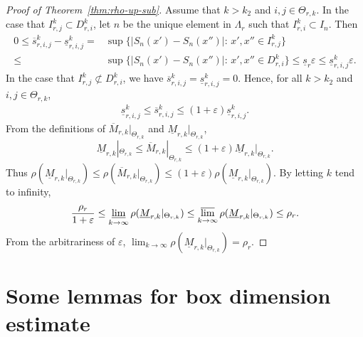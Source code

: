 \documentclass[11pt]{amsart}
\theoremstyle{definition}
\theoremstyle{remark}
\numberwithin{equation}{section}
\newcommand{\upM}{{\overline{M}}}
\newcommand{\lowM}{{\underline{M}}}
\newcommand{\ups}{{\overline{s} }}
\newcommand{\lows}{{\underline{s}}}
\newcommand{\uprho}{{{\rho}}}
\def\vep{\varepsilon}
\begin{document}
\begin{proof}[Proof of Theorem~\ref{thm:rho-up-sub}]


Assume that $k>k_2$ and $i,j \in \Theta_{r,k}$. 
In the case that $I_{r,j}^k \subset D_{r,i}^k $, 
let $n$ be the unique element in $\Lambda_r$ such that $I_{r,i}^k \subset I_n$.
Then
\begin{align*}
	0\leq  \ups_{r,i,j}^k-\lows_{r,i,j}^k 
	=	&\sup\big\{ |S_n(x')-S_n(x'')|:\, x',x''\in I_{r,j}^k\big\} \\
	\leq 	&\sup\big\{ |S_n(x')-S_n(x'')|:\, x',x''\in D_{r,i}^k\big\} 
    \leq \lows_r\vep \leq  \lows_{r,i,j}^k  \vep.
\end{align*}
In the case that $I_{r,j}^k \not\subset D_{r,i}^k $, we have $\ups_{r,i,j}^k=\lows_{r,i,j}^k=0$.
Hence, for all $k>k_2$ and $i,j \in \Theta_{r,k}$,
\begin{align*}
	\lows_{r,i,j}^k \leq \ups_{r,i,j}^k \leq (1 +\vep)\lows_{r,i,j}^k .
\end{align*}
From the definitions of $\upM_{r,k}|_{\Theta_{r,k}}$ and $\lowM_{r,k}|_{\Theta_{r,k}}$, 
$$\lowM_{r,k}|_{\Theta_{r,k}} \leq \upM_{r,k}|_{\Theta_{r,k}} \leq (1 +\vep) \lowM_{r,k}|_{\Theta_{r,k}}.$$
Thus
$\rho (\lowM_{r,k}|_{\Theta_{r,k}}) \leq \rho( \upM_{r,k}|_{\Theta_{r,k}}) \leq (1 +\vep) \rho(\lowM_{r,k}|_{\Theta_{r,k}})$.
By letting $k$ tend to infinity, 
\[
 \frac{\uprho_r}{1+\vep} \leq \varliminf_{k  \to \infty}\rho(\lowM_{r,k}|_{\Theta_{r,k}})
 \leq \varlimsup_{k  \to \infty}\rho(\lowM_{r,k}|_{\Theta_{r,k}}) \leq  \uprho_r.
\]
From the arbitrariness of $\vep$, $\lim_{k  \to \infty}\rho(\lowM_{r,k}|_{\Theta_{r,k}})=\uprho_r$.
\end{proof}



\section{Some lemmas for box dimension estimate}
\end{document}
